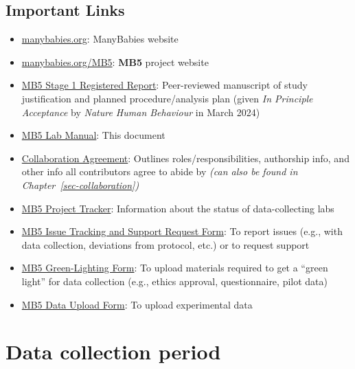 \documentclass[
  letterpaper,
  DIV=11,
  numbers=noendperiod,
  oneside]{scrreprt}
\begin{document}
\section{Important Links}\label{important-links}

\begin{itemize}
\item
  \href{https://manybabies.org/}{manybabies.org}: ManyBabies website
\item
  \href{https://manybabies.org/MB5/}{manybabies.org/MB5}: \textbf{MB5}
  project website
\item
  \href{https://doi.org/10.31234/osf.io/ck3vd}{MB5 Stage 1 Registered
  Report}: Peer-reviewed manuscript of study justification and planned
  procedure/analysis plan (given \emph{In Principle Acceptance} by
  \emph{Nature Human Behaviour} in March 2024)
\item
  \href{https://manybabies.org/mb5-manual}{MB5 Lab Manual}: This
  document
\item
  \href{https://docs.google.com/document/d/1vbTDmH6euda5pJN4uyds3zsnQ1DXrW9wpHogwC-5TSk/edit?usp=sharing}{Collaboration
  Agreement}: Outlines roles/responsibilities, authorship info, and
  other info all contributors agree to abide by \emph{(can also be found
  in Chapter~\ref{sec-collaboration})}
\item
  \href{https://manybabies.org/mb5-tracker}{MB5 Project Tracker}:
  Information about the status of data-collecting labs
\item
  \href{https://airtable.com/appRoqMKzcK3NsXt4/pagGafhoHcuVMs7ZV/form}{MB5
  Issue Tracking and Support Request Form}: To report issues (e.g., with
  data collection, deviations from protocol, etc.) or to request support
\item
  \href{https://airtable.com/appRoqMKzcK3NsXt4/pagPm3MXnFExsz1Ti/form}{MB5
  Green-Lighting Form}: To upload materials required to get a ``green
  light'' for data collection (e.g., ethics approval, questionnaire,
  pilot data)
\item
  \href{https://airtable.com/appRoqMKzcK3NsXt4/pagTs6VPOhcjesYd5/form}{MB5
  Data Upload Form}: To upload experimental data
\end{itemize}

\chapter{Data collection period}\label{sec-testdates}

\begin{tcolorbox}[enhanced jigsaw, coltitle=black, colframe=quarto-callout-important-color-frame, titlerule=0mm, colback=white, arc=.35mm, toprule=.15mm, left=2mm, colbacktitle=quarto-callout-important-color!10!white, opacityback=0, bottomtitle=1mm, title=\textcolor{quarto-callout-important-color}{\faExclamation}\hspace{0.5em}{DO NOT BEGIN DATA COLLECTION FOR \textbf{MB5} UNTIL PROJECT LEADS GIVE
YOUR LAB A ``GREEN-LIGHT''!!}, breakable, rightrule=.15mm, opacitybacktitle=0.6, toptitle=1mm, leftrule=.75mm, bottomrule=.15mm]

\end{tcolorbox}
\end{document}
